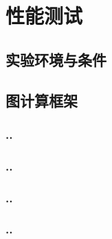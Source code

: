 
\chapter{性能测试}

\section{实验环境与条件}

\section{图计算框架}
\subsection{..}
\subsection{..}
\subsection{..}
\subsection{..}






